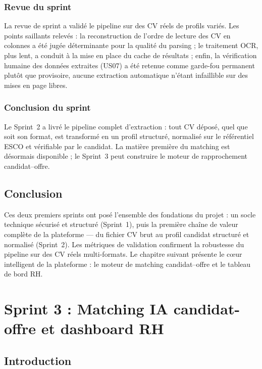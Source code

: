 \documentclass[12pt,a4paper]{report}
\begin{document}
\subsection{Revue du sprint}

La revue de sprint a validé le pipeline sur des CV réels de profils variés. Les points saillants relevés : la reconstruction de l'ordre de lecture des CV en colonnes a été jugée déterminante pour la qualité du parsing ; le traitement OCR, plus lent, a conduit à la mise en place du cache de résultats ; enfin, la vérification humaine des données extraites (US07) a été retenue comme garde-fou permanent plutôt que provisoire, aucune extraction automatique n'étant infaillible sur des mises en page libres.

\subsection{Conclusion du sprint}

Le Sprint~2 a livré le pipeline complet d'extraction : tout CV déposé, quel que soit son format, est transformé en un profil structuré, normalisé sur le référentiel ESCO et vérifiable par le candidat. La matière première du matching est désormais disponible ; le Sprint~3 peut construire le moteur de rapprochement candidat--offre.

\section{Conclusion}

Ces deux premiers sprints ont posé l'ensemble des fondations du projet : un socle technique sécurisé et structuré (Sprint~1), puis la première chaîne de valeur complète de la plateforme --- du fichier CV brut au profil candidat structuré et normalisé (Sprint~2). Les métriques de validation confirment la robustesse du pipeline sur des CV réels multi-formats. Le chapitre suivant présente le c\oe ur intelligent de la plateforme : le moteur de matching candidat--offre et le tableau de bord RH.
\newpage

\chapter{Sprint 3 : Matching IA candidat-offre et dashboard RH}

\section{Introduction}
\end{document}
